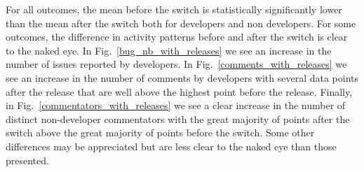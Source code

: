 \documentclass[conference]{IEEEtran}
\begin{document}
For all outcomes, the mean before the switch is statistically significantly lower than the mean after the switch both for developers and non developers. For some outcomes, the difference in activity patterns before and after the switch is clear to the naked eye. In Fig.~\ref{bug_nb_with_releases} we see an increase in the number of issues reported by developers. In Fig.~\ref{comments_with_releases} we see an increase in the number of comments by developers with several data points after the release that are well above the highest point before the release. Finally, in Fig.~\ref{commentators_with_releases} we see a clear increase in the number of distinct non-developer commentators with the great majority of points after the switch above the great majority of points before the switch. Some other differences may be appreciated but are less clear to the naked eye than those presented.






\end{document}
